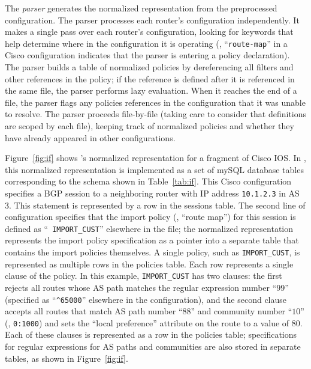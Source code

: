 The {\em parser} generates the normalized representation from the
preprocessed configuration.  
The parser processes each router's configuration independently.  It
makes a single pass over each router's configuration, looking for keywords
that help determine where in the configuration it is operating (\eg,
``{\tt route-map}'' in a Cisco configuration indicates that the parser
is entering a policy declaration).  The parser builds a table of
normalized policies by
dereferencing all filters and other references in the policy; if the
reference is defined after it is referenced in the same file, the
parser performs lazy evaluation.  When it reaches the end of a file, the
parser flags any policies references in the configuration that it was
unable to resolve.  The parser proceeds file-by-file (taking care to
consider that definitions are scoped by each file), keeping track of
normalized policies and whether they have already appeared in other
configurations. 

Figure~\ref{fig:if} shows \rccns's normalized representation for a
fragment of Cisco IOS.  In \rccns, this normalized representation is
implemented as a set of mySQL database tables corresponding to the
schema shown in Table~\ref{tab:if}.  This Cisco configuration specifies
a BGP session to a neighboring router with IP address {\tt 10.1.2.3} in
AS 3.  This statement is represented by a row in the {\tf sessions}
table.  The second line of configuration specifies that the import
policy (\ie, ``route map'') for this session is defined as ``{\tt
IMPORT\_CUST}'' elsewhere in the file; the normalized representation
represents the import policy specification as a pointer into a separate
table that contains the import policies themselves.  A single policy,
such as {\tt IMPORT\_CUST}, is represented as multiple rows in the {\tf
policies} table.  Each row represents a single clause of the policy.  In
this example, {\tt IMPORT\_CUST} has two clauses: the first rejects all
routes whose AS path matches the regular expression number ``$99$''
(specified as ``{\tt \^{}65000}'' elsewhere in the configuration), and
the second clause accepts all routes that match AS path number ``$88$''
and community number ``$10$'' (\ie, {\tt 0:1000}) and sets the ``local
preference'' 
attribute on the route to a value of $80$.  Each of these clauses is
represented as a row in the {\tf policies} table; specifications for regular
expressions for AS paths and communities are also stored in separate
tables, as shown in Figure~\ref{fig:if}.

